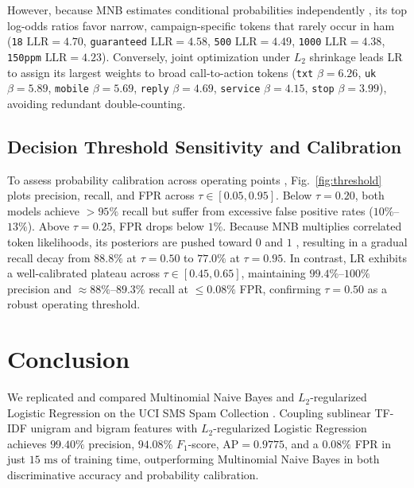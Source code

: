 \documentclass[conference]{IEEEtran}
\begin{document}
However, because MNB estimates conditional probabilities independently
\cite{mccallum1998comparison, zhang2004optimality}, its top log-odds ratios
favor narrow, campaign-specific tokens that rarely occur in ham (\texttt{18}
$\text{LLR} = 4.70$, \texttt{guaranteed} $\text{LLR} = 4.58$, \texttt{500}
$\text{LLR} = 4.49$, \texttt{1000} $\text{LLR} = 4.38$, \texttt{150ppm}
$\text{LLR} = 4.23$). Conversely, joint optimization under $L_2$ shrinkage
\cite{DREISEITL2002352} leads LR to assign its largest weights to broad
call-to-action tokens (\texttt{txt} $\beta = 6.26$, \texttt{uk}
$\beta = 5.89$, \texttt{mobile} $\beta = 5.69$, \texttt{reply}
$\beta = 4.69$, \texttt{service} $\beta = 4.15$, \texttt{stop}
$\beta = 3.99$), avoiding redundant double-counting.

\subsection{Decision Threshold Sensitivity and Calibration}
To assess probability calibration across operating points
\cite{DREISEITL2002352, metsis2006spam}, Fig.~\ref{fig:threshold} plots
precision, recall, and FPR across $\tau \in [0.05, 0.95]$. Below
$\tau = 0.20$, both models achieve $>95\%$ recall but suffer from excessive
false positive rates ($10\%$--$13\%$). Above $\tau = 0.25$, FPR drops below
$1\%$. Because MNB multiplies correlated token likelihoods, its posteriors
are pushed toward $0$ and $1$ \cite{metsis2006spam, zhang2004optimality},
resulting in a gradual recall decay from $88.8\%$ at $\tau = 0.50$ to $77.0\%$
at $\tau = 0.95$. In contrast, LR exhibits a well-calibrated plateau across
$\tau \in [0.45, 0.65]$, maintaining $99.4\%$--$100\%$ precision and
$\approx 88\%$--$89.3\%$ recall at $\le 0.08\%$ FPR, confirming $\tau = 0.50$
as a robust operating threshold.


\section{Conclusion}

We replicated and compared Multinomial Naive Bayes and $L_2$-regularized
Logistic Regression on the UCI SMS Spam Collection
\cite{10.1145/2034691.2034742, sms_spam_collection_228}. Coupling sublinear
TF-IDF unigram and bigram features with $L_2$-regularized Logistic Regression
achieves $99.40\%$ precision, $94.08\%$ $F_1$-score, $\text{AP} = 0.9775$,
and a $0.08\%$ FPR in just $15\text{ ms}$ of training time, outperforming
Multinomial Naive Bayes in both discriminative accuracy and probability
calibration.



\end{document}
